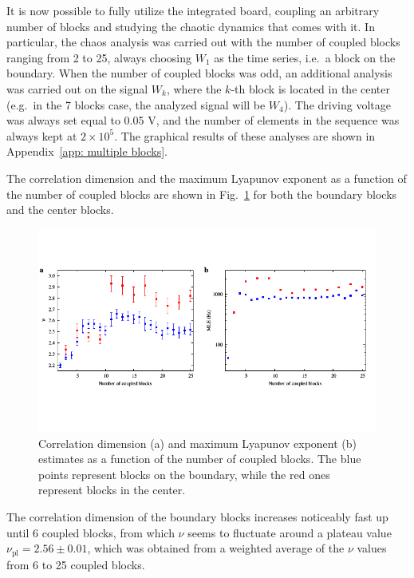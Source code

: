 It is now possible to fully utilize the integrated board, coupling an arbitrary number
of blocks and studying the chaotic dynamics that comes with it.
In particular, the chaos analysis was carried out with the number of coupled blocks ranging from
2 to 25, always choosing $W_1$ as the time series, i.e.\ a block on the boundary.
When the number of coupled blocks was odd, an additional analysis was carried out on the signal $W_k$,
where the $k$-th block is located in the center (e.g.\ in the 7 blocks case,
the analyzed signal will be $W_4$). The driving voltage was always set equal to 0.05 V, and the
number of elements in the sequence was always kept at $2\times10^5$.
The graphical results of these analyses are shown in Appendix~\ref{app: multiple blocks}.

The correlation dimension and the maximum Lyapunov exponent as a function of the number of coupled
blocks are shown in Fig.~\ref{fig:nu mle blocks} for both the boundary blocks and the center blocks.

\begin{figure}[ht!]
    \centering
    \includegraphics[width=\linewidth,trim={0 1.5cm 0 1.3cm},clip]
    {../blocks/data/nu_mle_blocks.pdf}
    \caption{Correlation dimension (a) and maximum Lyapunov exponent (b) estimates
    as a function of the number of coupled blocks. The blue points represent blocks on the boundary,
    while the red ones represent blocks in the center.}\label{fig:nu mle blocks}
\end{figure}

The correlation dimension of the boundary blocks increases noticeably fast up until 6 coupled blocks,
from which $\nu$ seems to fluctuate around a plateau value $\nu_{\text{pl}}=2.56\pm0.01$, which was
obtained from a weighted average of the $\nu$ values from 6 to 25 coupled blocks.

